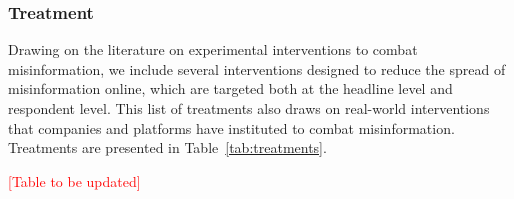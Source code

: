 \documentclass[letterpaper, 12pt, parskip=full,]{scrartcl}
\begin{document}
\subsubsection{Treatment}
Drawing on the literature on experimental interventions to combat misinformation, we include several interventions designed to reduce the spread of misinformation online, which are targeted both at the headline level and respondent level. This list of treatments also draws on real-world interventions that companies and platforms have instituted to combat misinformation. Treatments are presented in Table~\ref{tab:treatments}. 


\textcolor{red}{[Table to be updated]}
\end{document}
